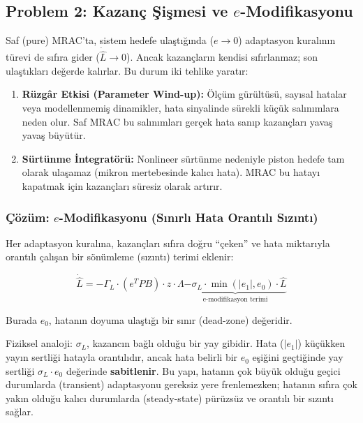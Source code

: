 \documentclass[12pt,a4paper]{article}
\begin{document}
\subsection{Problem 2: Kazanç Şişmesi ve $e$-Modifikasyonu}
\label{subsec:sigma}

Saf (pure) MRAC'ta, sistem hedefe ulaştığında ($e \to 0$) adaptasyon kuralının türevi de sıfıra gider ($\dot{\hat{L}} \to 0$). Ancak kazançların kendisi sıfırlanmaz; son ulaştıkları değerde kalırlar. Bu durum iki tehlike yaratır:

\begin{enumerate}
    \item \textbf{Rüzgâr Etkisi (Parameter Wind-up):} Ölçüm gürültüsü, sayısal hatalar veya modellenmemiş dinamikler, hata sinyalinde sürekli küçük salınımlara neden olur. Saf MRAC bu salınımları gerçek hata sanıp kazançları yavaş yavaş büyütür.
    \item \textbf{Sürtünme İntegratörü:} Nonlineer sürtünme nedeniyle piston hedefe tam olarak ulaşamaz (mikron mertebesinde kalıcı hata). MRAC bu hatayı kapatmak için kazançları süresiz olarak artırır.
\end{enumerate}

\subsubsection{Çözüm: $e$-Modifikasyonu (Sınırlı Hata Orantılı Sızıntı)}

Her adaptasyon kuralına, kazançları sıfıra doğru ``çeken'' ve hata miktarıyla orantılı çalışan bir sönümleme (sızıntı) terimi eklenir:

\begin{equation}
    \dot{\hat{L}} = -\Gamma_L \cdot (e^T P B) \cdot z \cdot \Lambda \underbrace{- \sigma_L \cdot \min(|e_1|, e_0) \cdot \hat{L}}_{\text{e-modifikasyon terimi}}
\end{equation}

Burada $e_0$, hatanın doyuma ulaştığı bir sınır (dead-zone) değeridir. 

Fiziksel analoji: $\sigma_L$, kazancın bağlı olduğu bir yay gibidir. Hata ($|e_1|$) küçükken yayın sertliği hatayla orantılıdır, ancak hata belirli bir $e_0$ eşiğini geçtiğinde yay sertliği $\sigma_L \cdot e_0$ değerinde \textbf{sabitlenir}. Bu yapı, hatanın çok büyük olduğu geçici durumlarda (transient) adaptasyonu gereksiz yere frenlemezken; hatanın sıfıra çok yakın olduğu kalıcı durumlarda (steady-state) pürüzsüz ve orantılı bir sızıntı sağlar.
\end{document}
